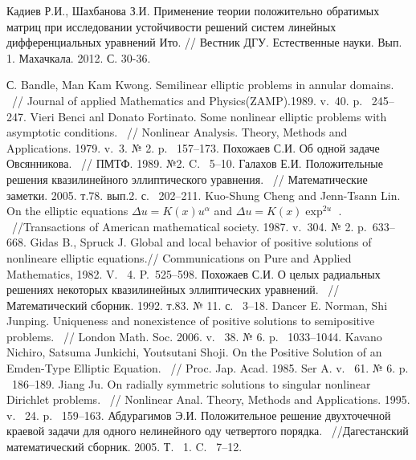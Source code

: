 \begin{thebibliography}{111}
	Кадиев Р.И., Шахбанова З.И. Применение теории положительно обратимых матриц при исследовании устойчивости решений
	систем линейных дифференциальных уравнений Ито. // Вестник ДГУ. Естественные науки. Вып. 1. Махачкала. 2012. С.
	30-36.












 С. Bandle, Man Kam Kwong. Semilinear elliptic problems in annular domains.
  ~// Journal of applied Mathematics and Physics(ZAMP).1989. v.~40. p. ~245--247.
 Vieri Benci anl Donato Fortinato. Some nonlinear elliptic problems
with asymptotic conditions. ~// Nonlinear Analysis. Theory, Methods
and Applications.  1979. v.~3. № 2. p. ~157--173.
 Похожаев С.И. Об одной задаче Овсянникова. ~// ПМТФ. 1989. №2. C. ~5--10.
Галахов Е.И. Положительные решения квазилинейного эллиптического
уравнения. ~// Математические заметки. 2005. т.78. вып.2. с.
~202--211.
 Kuo-Shung Cheng and Jenn-Tsann Lin. On the elliptic equations
$ \Delta u=K(x)u^{\alpha} $   and $ \Delta u=K(x)\exp^{2u} $  .
 ~//Transactions of American mathematical society. 1987. v.~304.
№ 2. p.~633--668.
 Gidas B., Spruck  J.  Global and local behavior of positive solutions
of nonlineare elliptic equations.//  Communications on Pure and
Applied Mathematics,  1982. V.~ 4. P.~525--598.
Похожаев С.И. О целых радиальных решениях некоторых квазилинейных
эллиптических уравнений. ~// Математический сборник. 1992. т.83.
№ 11. с. ~3--18.
Dancer E. Norman, Shi Junping. Uniqueness and nonexistence of
positive solutions to semipositive problems. ~// London Math. Soc.
2006. v. ~38. № 6.  p. ~1033--1044.
Kavano Nichiro, Satsuma Junkichi, Youtsutani Shoji. On the Positive
Solution of an Emden-Type Elliptic Equation. ~// Proc. Jap. Acad.
1985.  Ser A. v. ~61. № 6. p. ~186--189.
Jiang Ju. On radially  symmetric solutions to singular nonlinear
Dirichlet problems. ~// Nonlinear Anal. Theory, Methods and
Applications. 1995. v. ~24.  p. ~159--163.
 Абдурагимов Э.И. Положительное решение двухточечной краевой задачи для
одного нелинейного оду четвертого порядка. ~//Дагестанский
математический сборник. 2005. Т. ~1. C. ~7--12.

\end{thebibliography}
